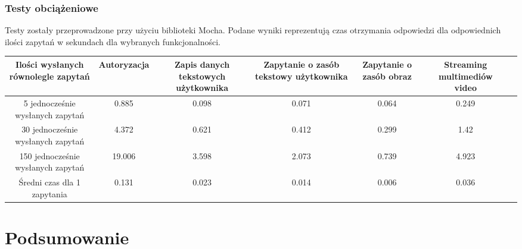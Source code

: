 \documentclass[12pt]{report}
\begin{document}
    \subsection{Testy obciążeniowe}
      Testy zostały przeprowadzone przy użyciu biblioteki Mocha.
      Podane wyniki reprezentują czas otrzymania odpowiedzi dla odpowiednich ilości zapytań w sekundach dla wybranych funkcjonalności.
      \newline
      \newline
      \newline
      \newline
      \newline
      \newline
      \newline
      \newline
      \newline
      \newline
      \newline
      \newline
      \begingroup
        \renewcommand{\arraystretch}{3.8}
        \begin{adjustbox}{center}
          \begin{tabular}{|c|c|c|c|c|c|p{2.0cm}}
            \hline
            \parbox{2.0cm}{Ilości wysłanych równolegle zapytań} & 
            \parbox{2.0cm}{Autoryzacja} & 
            \parbox{2.0cm}{Zapis danych tekstowych użytkownika} & 
            \parbox{2.0cm}{Zapytanie o zasób tekstowy użytkownika} & 
            \parbox{2.0cm}{Zapytanie o zasób obraz} & 
            \parbox{2.0cm}{Streaming multimediów video} \\
            \hline
            \parbox{2.0cm}{5 jednocześnie wysłanych zapytań} & 0.885 & 0.098 & 0.071 & 0.064 & 0.249 \\
            \hline
            \parbox{2.0cm}{30 jednocześnie wysłanych zapytań} & 4.372 & 0.621 & 0.412 & 0.299 & 1.42 \\
            \hline
            \parbox{2.0cm}{150 jednocześnie wysłanych zapytań} & 19.006 & 3.598 & 2.073 & 0.739 & 4.923 \\
            \hline
            \parbox{2.0cm}{Średni czas dla 1 zapytania} & 0.131 & 0.023 & 0.014 & 0.006 & 0.036 \\
            \hline
          \end{tabular}
        \end{adjustbox}
      \endgroup
    
\chapter{Podsumowanie}
\end{document}
